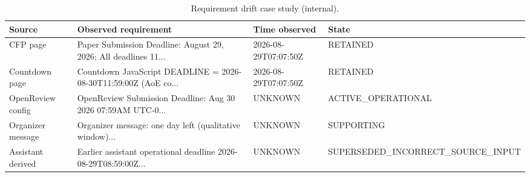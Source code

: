 \begin{table}[h]
\centering
\caption{Requirement drift case study (internal).}
\begin{tabular}{llll}
\toprule
Source & Observed requirement & Time observed & State \\
\midrule
CFP page & Paper Submission Deadline: August 29, 2026; All deadlines 11... & 2026-08-29T07:07:50Z & RETAINED \\
Countdown page & Countdown JavaScript DEADLINE = 2026-08-30T11:59:00Z (AoE co... & 2026-08-29T07:07:50Z & RETAINED \\
OpenReview config & OpenReview Submission Deadline: Aug 30 2026 07:59AM UTC-0... & UNKNOWN & ACTIVE_OPERATIONAL \\
Organizer message & Organizer message: one day left (qualitative window)... & UNKNOWN & SUPPORTING \\
Assistant derived & Earlier assistant operational deadline 2026-08-29T08:59:00Z... & UNKNOWN & SUPERSEDED_INCORRECT_SOURCE_INPUT \\
\bottomrule
\end{tabular}
\end{table}
